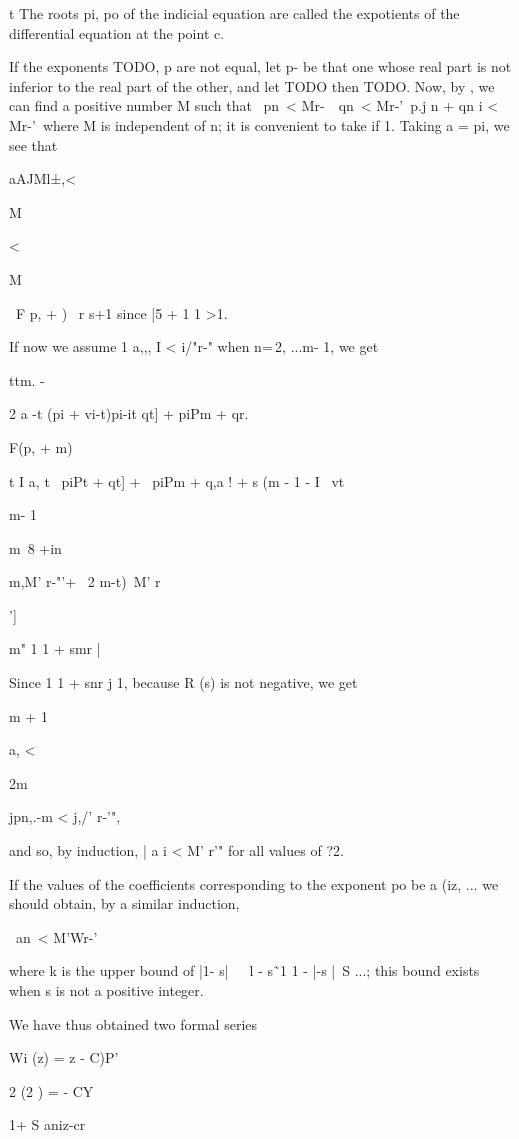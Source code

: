 t The roots pi, po of the indicial equation are called the expotients
of the differential equation at the point c.

%
%


If the exponents TODO, p are not equal, let p- be that one whose real
part is not inferior to the real part of the other, and let
TODO
then
TODO.
Now, by , we can find a positive number M
such that \ pn\ < Mr-\ \ qn\ < Mr-'\ p.j n + qn i < Mr-'\ where M is
independent of n; it is convenient to take if 1. Taking a = pi, we
see that

aAJMl±,<

M

<

M

\ F p, + ) \ r s+1 since |5 + 1 1 >1.

If now we assume 1 a,,, I < i/"r-" when n=\,2, ...m- 1, we get

ttm. -

2 a -t (pi + vi-t)pi-it qt] + piPm + qr.

F(p, + m)

t I a, t \ piPt + qt] + \ piPm + q,a ! + s (m - 1 - I \ vt

m- 1

m\ 8 +in\

m,M' r-"'+ \ 2 m-t)\ M' r

']

m" 1 1 + smr |

Since 1 1 + snr j 1, because R (s) is not negative, we get

m + 1

a, <

2m

jpn,.-m < j,/' r-'",

and so, by induction, | a i < M' r'" for all values of ?2.

If the values of the coefficients corresponding to the exponent po be
a (iz, ... we should obtain, by a similar induction,

\ an\ < M'Wr-'\

where k is the upper bound of |1- s|~\ \ l - s\~\ 1 1 - |-s |~S ...;
this bound exists when s is not a positive integer.

We have thus obtained two formal series

Wi (z) = z - C)P'

 2 (2 ) = - CY

1+ S aniz-cr

